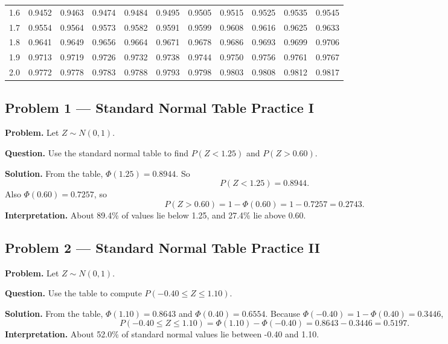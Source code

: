 \begin{center}
\begin{tabular}{c|cccccccccc}
		1.6 & 0.9452 & 0.9463 & 0.9474 & 0.9484 & 0.9495 & 0.9505 & 0.9515 & 0.9525 & 0.9535 & 0.9545 \\
		1.7 & 0.9554 & 0.9564 & 0.9573 & 0.9582 & 0.9591 & 0.9599 & 0.9608 & 0.9616 & 0.9625 & 0.9633 \\
		1.8 & 0.9641 & 0.9649 & 0.9656 & 0.9664 & 0.9671 & 0.9678 & 0.9686 & 0.9693 & 0.9699 & 0.9706 \\
		1.9 & 0.9713 & 0.9719 & 0.9726 & 0.9732 & 0.9738 & 0.9744 & 0.9750 & 0.9756 & 0.9761 & 0.9767 \\
		2.0 & 0.9772 & 0.9778 & 0.9783 & 0.9788 & 0.9793 & 0.9798 & 0.9803 & 0.9808 & 0.9812 & 0.9817 \\
		\bottomrule
	\end{tabular}
	\end{center}
	
	\begin{ExamProblems}
		
		\hypertarget{c5-ex1}{}
		\item
		\subsection*{Problem 1 — Standard Normal Table Practice I}
		
		\textbf{Problem.}
		Let \(Z\sim N(0,1)\).
		
		\textbf{Question.} Use the standard normal table to find \(P(Z<1.25)\) and \(P(Z>0.60)\).
		
		\textbf{Solution.}
		From the table, \(\Phi(1.25)=0.8944\).
		So
		\[
		P(Z<1.25)=0.8944.
		\]
		Also \(\Phi(0.60)=0.7257\), so
		\[
		P(Z>0.60)=1-\Phi(0.60)=1-0.7257=0.2743.
		\]
		\textbf{Interpretation.} About 89.4\% of values lie below 1.25, and 27.4\% lie above 0.60.
		
		
		\hypertarget{c5-ex2}{}
		\item
		\subsection*{Problem 2 — Standard Normal Table Practice II}
		
		\textbf{Problem.}
		Let \(Z\sim N(0,1)\).
		
		\textbf{Question.} Use the table to compute \(P(-0.40\le Z\le 1.10)\).
		
		\textbf{Solution.}
		From the table, \(\Phi(1.10)=0.8643\) and \(\Phi(0.40)=0.6554\).
		Because \(\Phi(-0.40)=1-\Phi(0.40)=0.3446\),
		\[
		P(-0.40\le Z\le 1.10)=\Phi(1.10)-\Phi(-0.40)=0.8643-0.3446=0.5197.
		\]
		\textbf{Interpretation.} About 52.0\% of standard normal values lie between -0.40 and 1.10.
		

\end{ExamProblems}
